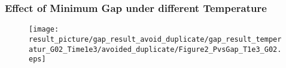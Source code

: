 \documentclass{beamer}
\begin{document}
\begin{frame}
	\frametitle{Effect of Minimum Gap under different Temperature }
	
	\begin{figure}
		\centering
		\texttt{[image: result\_picture/gap\_result\_avoid\_duplicate/gap\_result\_temperatur\_G02\_Time1e3/avoided\_duplicate/Figure2\_PvsGap\_T1e3\_G02.eps]}	
	\end{figure}
\end{frame}





\end{document}

